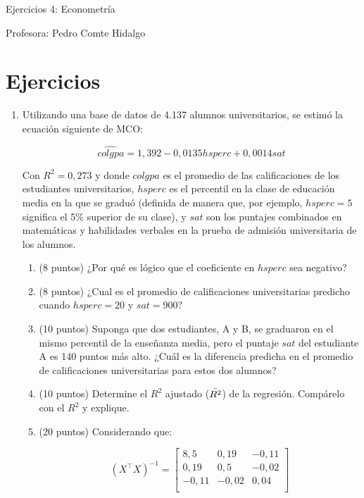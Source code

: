\documentclass[10pt,a4paper]{article}
\begin{document}
\vspace{5cm}

\begin{center}
    {\Large  Ejercicios 4: Econometría }

Profesora:    Pedro Comte Hidalgo
\end{center}



\section{Ejercicios}
\begin{enumerate}
    \item Utilizando una base de datos de 4.137 alumnos universitarios, se estimó la ecuación siguiente de MCO:

    
$$\hat{colgpa} =1,392 -0,0135 hsperc + 0,0014 sat$$

Con $R^2=0,273$ y donde $colgpa$ es el promedio de las calificaciones de los estudiantes universitarios,
$hsperc$ es el percentil en la clase de educación media en la que se graduó (definida de manera que, por
ejemplo, $hsperc= 5$ significa el 5\% superior de su clase), y $sat$ son los puntajes combinados en
matemáticas y habilidades verbales en la prueba de admisión universitaria de los alumnos.
\begin{enumerate} 
\item (8 puntos) ¿Por qué es lógico que el coeficiente en $hsperc$ sea negativo?


\item  (8 puntos) ¿Cual es el promedio de calificaciones universitarias predicho cuando $hsperc= 20$ y $sat=900$?




\item (10 puntos) Suponga que dos estudiantes, A y B, se graduaron en el mismo percentil de la enseñanza media, pero el puntaje $sat$ del estudiante A es 140 puntos más alto. ¿Cuál es la diferencia predicha en el promedio
de calificaciones universitarias para estos dos alumnos? 



\item (10 puntos) Determine el $R^2$ ajustado ($\Bar{R^2}$) de la regresión. Compárelo con el $R^2$ y explique.



\item (20 puntos) Considerando que:

\[(X^\top X)^{-1} =
\begin{bmatrix}
8,5 & 0,19 & -0,11 \\
0,19 & 0,5 & -0,02 \\
-0,11 & -0,02 & 0,04 \\
\end{bmatrix}
\]


\end{enumerate}
\end{enumerate}
\end{document}
